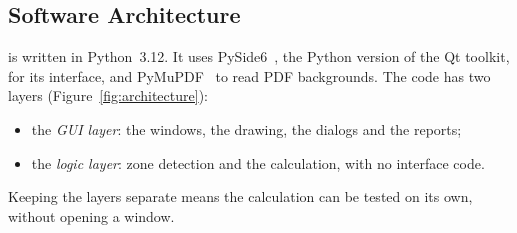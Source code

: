 \subsection{Software Architecture}

\app{} is written in Python~3.12. It uses PySide6~\cite{pyside6}, the Python version
of the Qt toolkit, for its interface, and PyMuPDF~\cite{pymupdf} to read PDF
backgrounds. The code has two layers (Figure~\ref{fig:architecture}):
\begin{itemize}
  \item the \emph{GUI layer}: the windows, the drawing, the dialogs and the reports;
  \item the \emph{logic layer}: zone detection and the calculation, with no interface
        code.
\end{itemize}
Keeping the layers separate means the calculation can be tested on its own, without
opening a window.


